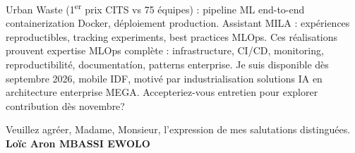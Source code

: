 \documentclass[a4paper,11pt]{article}
\begin{document}
\vspace{0.8em}
\noindent Urban Waste (1\textsuperscript{er} prix CITS vs 75 \'equipes) : pipeline ML end-to-end containerization Docker, d\'eploiement production. Assistant MILA : exp\'eriences reproductibles, tracking experiments, best practices MLOps. Ces r\'ealisations prouvent expertise MLOps compl\`ete : infrastructure, CI/CD, monitoring, reproductibilit\'e, documentat\'ion, patterns enterprise. Je suis disponible d\`es septembre 2026, mobile IDF, motiv\'e par industrialisation solutions IA en architecture enterprise MEGA. Accepteriez-vous entretien pour explorer contribution d\`es novembre?

\vspace{1.5em}
\noindent Veuillez agr\'eer, Madame, Monsieur, l'expression de mes salutations distingu\'ees.
\vspace{2em}
\noindent \textbf{Lo\"ic Aron MBASSI EWOLO}
\end{document}
